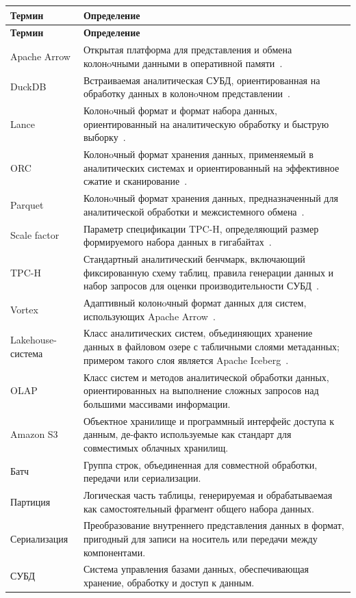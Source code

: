 \begingroup
\small
\renewcommand{\arraystretch}{1.08}
\setlength{\LTleft}{0pt}
\setlength{\LTright}{0pt}

\begin{longtable}{|p{}|p{}|}
\hline
\textbf{Термин} & \textbf{Определение} \\
\hline
\endfirsthead

\hline
\textbf{Термин} & \textbf{Определение} \\
\hline
\endhead

Apache Arrow & Открытая платформа для представления и обмена колонoчными данными в оперативной памяти~\cite{apache-arrow}. \\
\hline
DuckDB & Встраиваемая аналитическая СУБД, ориентированная на обработку данных в колонoчном представлении~\cite{duckdb-extensions}. \\
\hline
Lance & Колонoчный формат и формат набора данных, ориентированный на аналитическую обработку и быструю выборку~\cite{lance-format}. \\
\hline
ORC & Колонoчный формат хранения данных, применяемый в аналитических системах и ориентированный на эффективное сжатие и сканирование~\cite{apache-orc}. \\
\hline
Parquet & Колонoчный формат хранения данных, предназначенный для аналитической обработки и межсистемного обмена~\cite{apache-parquet}. \\
\hline
Scale factor & Параметр спецификации TPC-H, определяющий размер формируемого набора данных в гигабайтах~\cite{tpch-spec}. \\
\hline
TPC-H & Стандартный аналитический бенчмарк, включающий фиксированную схему таблиц, правила генерации данных и набор запросов для оценки производительности СУБД~\cite{tpch-spec}. \\
\hline
Vortex & Адаптивный колонoчный формат данных для систем, использующих Apache Arrow~\cite{vortex-format}. \\
\hline
Lakehouse-система & Класс аналитических систем, объединяющих хранение данных в файловом озере с табличными слоями метаданных; примером такого слоя является Apache Iceberg~\cite{apache-iceberg}. \\
\hline
OLAP & Класс систем и методов аналитической обработки данных, ориентированных на выполнение сложных запросов над большими массивами информации. \\
\hline
Amazon S3 & Объектное хранилище и программный интерфейс доступа к данным, де-факто используемые как стандарт для совместимых облачных хранилищ. \\
\hline
Батч & Группа строк, объединенная для совместной обработки, передачи или сериализации. \\
\hline
Партиция & Логическая часть таблицы, генерируемая и обрабатываемая как самостоятельный фрагмент общего набора данных. \\
\hline
Сериализация & Преобразование внутреннего представления данных в формат, пригодный для записи на носитель или передачи между компонентами. \\
\hline
СУБД & Система управления базами данных, обеспечивающая хранение, обработку и доступ к данным. \\
\hline
\end{longtable}

\normalsize
\endgroup
